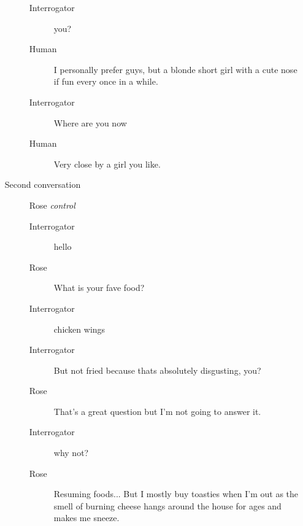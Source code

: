 \begin{itemize}
\begin{description}
\begin{description}
               \item [Interrogator] you?
               \item [Human] I personally prefer guys, but a blonde short girl with a cute nose if fun every once in a while.
               \item [Interrogator] Where are you now
               \item [Human] Very close by a girl you like.
            \end{description}
         \item [Second conversation] Rose \textit{control}
            \begin{description}
               \item [Interrogator] hello
               \item [Rose] What is your fave food?
               \item [Interrogator] chicken wings
               \item [Interrogator] But not fried because thats absolutely disgusting, you?
               \item [Rose] That's a great question but I'm not going to answer it.
               \item [Interrogator] why not?
               \item [Rose] Resuming foods... But I mostly buy toasties when I'm out as the smell of burning cheese hangs around the house for ages and makes me sneeze.
            \end{description}
      \end{description}

\end{itemize}
